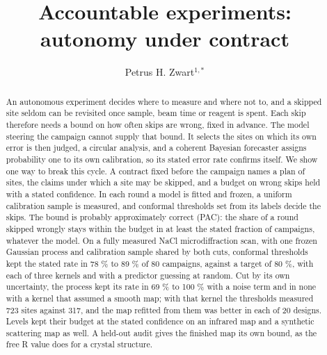 \documentclass{iopjournal}
\begin{document}

\title{Accountable experiments: autonomy under contract}

\author{Petrus H. Zwart$^{1,*}$}





\begin{abstract}
An autonomous experiment decides where to measure and where not to, and a skipped site seldom can be revisited once sample, beam time or reagent is spent. Each skip therefore needs a bound on how often skips are wrong, fixed in advance. The model steering the campaign cannot supply that bound. It selects the sites on which its own error is then judged, a circular analysis, and a coherent Bayesian forecaster assigns probability one to its own calibration, so its stated error rate confirms itself. We show one way to break this cycle. A contract fixed before the campaign names a plan of sites, the claims under which a site may be skipped, and a budget on wrong skips held with a stated confidence. In each round a model is fitted and frozen, a uniform calibration sample is measured, and conformal thresholds set from its labels decide the skips. The bound is probably approximately correct (PAC): the share of a round skipped wrongly stays within the budget in at least the stated fraction of campaigns, whatever the model. On a fully measured NaCl microdiffraction scan, with one frozen Gaussian process and calibration sample shared by both cuts, conformal thresholds kept the stated rate in 78 \% to 89 \% of 80 campaigns, against a target of 80 \%, with each of three kernels and with a predictor guessing at random. Cut by its own uncertainty, the process kept its rate in 69 \% to 100 \% with a noise term and in none with a kernel that assumed a smooth map; with that kernel the thresholds measured 723 sites against 317, and the map refitted from them was better in each of 20 designs. Levels kept their budget at the stated confidence on an infrared map and a synthetic scattering map as well. A held-out audit gives the finished map its own bound, as the free R value does for a crystal structure.
\end{abstract}
\end{document}
